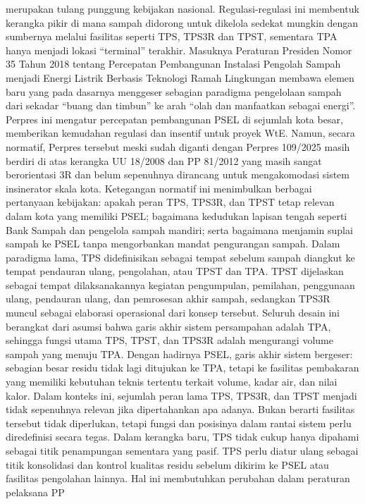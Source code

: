 \documentclass[
  letterpaper,
  DIV=11,
  numbers=noendperiod]{scrreprt}
\begin{document}
merupakan tulang punggung kebijakan nasional. Regulasi-regulasi ini
membentuk kerangka pikir di mana sampah didorong untuk dikelola sedekat
mungkin dengan sumbernya melalui fasilitas seperti TPS, TPS3R dan TPST,
sementara TPA hanya menjadi lokasi ``terminal'' terakhir. Masuknya
Peraturan Presiden Nomor 35 Tahun 2018 tentang Percepatan Pembangunan
Instalasi Pengolah Sampah menjadi Energi Listrik Berbasis Teknologi
Ramah Lingkungan membawa elemen baru yang pada dasarnya menggeser
sebagian paradigma pengelolaan sampah dari sekadar ``buang dan timbun''
ke arah ``olah dan manfaatkan sebagai energi''. Perpres ini mengatur
percepatan pembangunan PSEL di sejumlah kota besar, memberikan kemudahan
regulasi dan insentif untuk proyek WtE. Namun, secara normatif, Perpres
tersebut meski sudah diganti dengan Perpres 109/2025 masih berdiri di
atas kerangka UU 18/2008 dan PP 81/2012 yang masih sangat berorientasi
3R dan belum sepenuhnya dirancang untuk mengakomodasi sistem insinerator
skala kota. Ketegangan normatif ini menimbulkan berbagai pertanyaan
kebijakan: apakah peran TPS, TPS3R, dan TPST tetap relevan dalam kota
yang memiliki PSEL; bagaimana kedudukan lapisan tengah seperti Bank
Sampah dan pengelola sampah mandiri; serta bagaimana menjamin suplai
sampah ke PSEL tanpa mengorbankan mandat pengurangan sampah. Dalam
paradigma lama, TPS didefinisikan sebagai tempat sebelum sampah diangkut
ke tempat pendauran ulang, pengolahan, atau TPST dan TPA. TPST
dijelaskan sebagai tempat dilaksanakannya kegiatan pengumpulan,
pemilahan, penggunaan ulang, pendauran ulang, dan pemrosesan akhir
sampah, sedangkan TPS3R muncul sebagai elaborasi operasional dari konsep
tersebut. Seluruh desain ini berangkat dari asumsi bahwa garis akhir
sistem persampahan adalah TPA, sehingga fungsi utama TPS, TPST, dan
TPS3R adalah mengurangi volume sampah yang menuju TPA. Dengan hadirnya
PSEL, garis akhir sistem bergeser: sebagian besar residu tidak lagi
ditujukan ke TPA, tetapi ke fasilitas pembakaran yang memiliki kebutuhan
teknis tertentu terkait volume, kadar air, dan nilai kalor. Dalam
konteks ini, sejumlah peran lama TPS, TPS3R, dan TPST menjadi tidak
sepenuhnya relevan jika dipertahankan apa adanya. Bukan berarti
fasilitas tersebut tidak diperlukan, tetapi fungsi dan posisinya dalam
rantai sistem perlu diredefinisi secara tegas. Dalam kerangka baru, TPS
tidak cukup hanya dipahami sebagai titik penampungan sementara yang
pasif. TPS perlu diatur ulang sebagai titik konsolidasi dan kontrol
kualitas residu sebelum dikirim ke PSEL atau fasilitas pengolahan
lainnya. Hal ini membutuhkan perubahan dalam peraturan pelaksana PP
\end{document}
